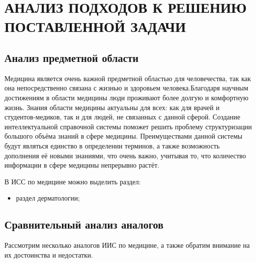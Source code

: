 \section{АНАЛИЗ ПОДХОДОВ К РЕШЕНИЮ ПОСТАВЛЕННОЙ ЗАДАЧИ}
\label{sec:domain}
\subsection{Анализ предметной области}
Медицина является очень важной предметной областью для человечества, так как она непосредственно связана с жизнью и здоровьем человека.Благодаря научным достижениям в области медицины люди проживают более долгую и комфортную жизнь. Знания области медицины актуальны для всех: как для врачей и студентов-медиков, так и для людей, не связанных с данной сферой. Создание интеллектуальной справочной системы поможет решить проблему структуризации большого объёма знаний в сфере
медицины. Преимуществами данной системы будут являться единство в определении терминов, а также возможность дополнения её новыми знаниями, что очень важно, учитывая то, что количество информации в сфере медицины непрерывно растёт.

В ИСС по медицине можно выделить раздел:
\begin{itemize}
	\item раздел дерматологии;
\end{itemize}

\subsection{Сравнительный анализ аналогов}

Рассмотрим несколько аналогов ИИС по медицине, а также обратим внимание на их достоинства и недостатки.

